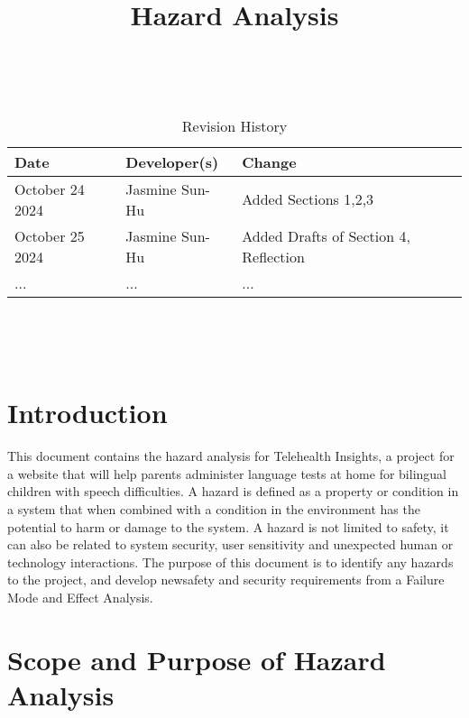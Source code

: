 \documentclass{article}
\title{Hazard Analysis\\\progname}
\author{\authname}
\date{}
\begin{document}
\maketitle
\thispagestyle{empty}

~\newpage


\begin{table}[hp]
\caption{Revision History} \label{TblRevisionHistory}
\begin{tabularx}{\textwidth}{llX}
\toprule
\textbf{Date} & \textbf{Developer(s)} & \textbf{Change}\\
\midrule
October 24 2024 & Jasmine Sun-Hu & Added Sections 1,2,3\\
October 25 2024 & Jasmine Sun-Hu & Added Drafts of Section 4, Reflection\\
... & ... & ...\\
\bottomrule
\end{tabularx}
\end{table}

~\newpage

\tableofcontents

~\newpage


\section{Introduction}

\hspace{1.5em} This document contains the hazard analysis for Telehealth Insights, a project for a website that will help 
parents administer language tests at home for bilingual children with speech difficulties. A hazard is defined as a 
property or condition in a system that when combined with a condition in the environment has the potential to harm or 
damage to the system. A hazard is not limited to safety, it can also be related to system security, user sensitivity and 
unexpected human or technology interactions. The purpose of this document is to identify any hazards to the project, and 
develop newsafety and security requirements from a Failure Mode and Effect Analysis.

\section{Scope and Purpose of Hazard Analysis}
\end{document}
